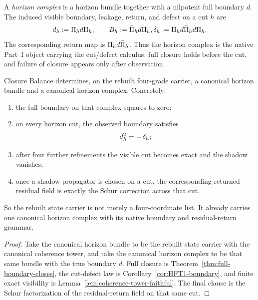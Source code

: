 \begin{definition}
\label{def:horizon-complex}
A \emph{horizon complex} is a horizon bundle together with a nilpotent full
boundary \(d\). The induced visible boundary, leakage, return, and defect on a
cut \(h\) are
\[
\CCObs{d}{h}:=\CCPi{h}d\CCPi{h},
\qquad
\CCLeak{d}{h}:=\CCPibar{h}d\CCPi{h},
\CCDefect{d}{h}:=\CCPi{h}d\CCPibar{h}d\CCPi{h}.
\]
The corresponding return map is \(\CCPi{h}d\CCPibar{h}\).
Thus the horizon complex is the native Part~I object carrying the cut/defect
calculus: full closure holds before the cut, and failure of closure appears
only after observation.
\end{definition}

\begin{theorem}
\label{thm:closure-balance-yields-the-canonical-horizon-complex}
Closure Balance determines, on the rebuilt four-grade carrier, a canonical
horizon bundle and a canonical horizon complex. Concretely:
\begin{enumerate}[label=(\roman*), leftmargin=2em, itemsep=0.2em]
\item the full boundary on that complex squares to zero;
\item on every horizon cut, the observed boundary satisfies
      \[
      \CCObs{d}{h}^2=-\,\CCDefect{d}{h};
      \]
\item after four further refinements the visible cut becomes exact and the
      shadow vanishes;
\item once a shadow propagator is chosen on a cut, the corresponding returned
      residual field is exactly the Schur correction across that cut.
\end{enumerate}
So the rebuilt state carrier is not merely a four-coordinate list. It already
carries one canonical horizon complex with its native boundary and
residual-return grammar.
\end{theorem}

\begin{proof}
Take the canonical horizon bundle to be the rebuilt state carrier with the
canonical coherence tower, and take the canonical horizon complex to be that
same bundle with the true boundary \(d\). Full closure is
Theorem~\ref{thm:full-boundary-closes}, the cut-defect law is
Corollary~\ref{cor:HFT1-boundary}, and finite exact visibility is
Lemma~\ref{lem:coherence-tower-faithful}. The final clause is the Schur
factorization of the residual-return field on that same cut.
\end{proof}

